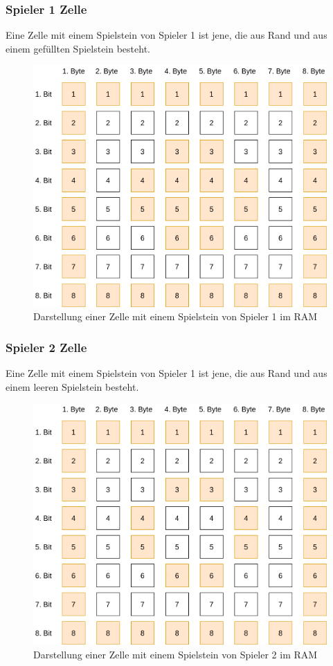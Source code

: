    \subsubsection{Spieler 1 Zelle}
        Eine Zelle mit einem Spielstein von Spieler 1 ist jene, die aus Rand und aus einem gefüllten Spielstein besteht.
        \begin{figure}[H]
            \centering
            \includegraphics[scale=0.25]{img/spieler1-zelle.png}    
            \caption{Darstellung einer Zelle mit einem Spielstein von Spieler 1 im RAM}
        \end{figure}
    
    \subsubsection{Spieler 2 Zelle}
        Eine Zelle mit einem Spielstein von Spieler 1 ist jene, die aus Rand und aus einem leeren Spielstein besteht.
        \begin{figure}[H]
            \centering
            \includegraphics[scale=0.25]{img/spieler2-zelle.png}    
            \caption{Darstellung einer Zelle mit einem Spielstein von Spieler 2 im RAM}
        \end{figure}

